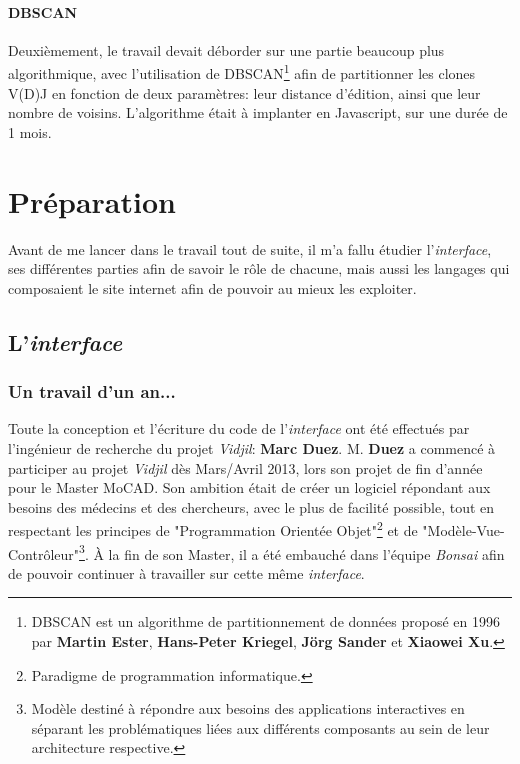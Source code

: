 \documentclass[pdftex,12pt,a4paper]{report}
\begin{document}
\begin{spacing}{1.2}
\subsubsection{DBSCAN}
Deuxièmement, le travail devait déborder sur une partie beaucoup plus algorithmique, avec l'utilisation de DBSCAN\footnote{DBSCAN est un algorithme de partitionnement de données proposé en 1996 par \textbf{Martin Ester}, \textbf{Hans-Peter Kriegel}, \textbf{Jörg Sander} et \textbf{Xiaowei Xu}.} afin de partitionner les clones V(D)J en fonction de deux paramètres: leur distance d'édition, ainsi que leur nombre de voisins.
\newline
L'algorithme était à implanter en Javascript, sur une durée de 1 mois.

\chapter{Préparation}

Avant de me lancer dans le travail tout de suite, il m'a fallu étudier l'\textit{interface}, ses différentes parties afin de savoir le rôle de chacune, mais aussi les langages qui composaient le site internet afin de pouvoir au mieux les exploiter.

\section{L'\textit{interface}}

\subsection{Un travail d'un an...}
Toute la conception et l'écriture du code de l'\textit{interface} ont été effectués par l'ingénieur de recherche du projet \textit{Vidjil}: \textbf{Marc Duez}. 
\newline
M. \textbf{Duez} a commencé à participer au projet \textit{Vidjil} dès Mars/Avril 2013, lors son projet de fin d'année pour le Master MoCAD.
Son ambition était de créer un logiciel répondant aux besoins des médecins et des chercheurs, avec le plus de facilité possible, tout en respectant les principes de "Programmation Orientée Objet"\footnote{Paradigme de programmation informatique.} et de "Modèle-Vue-Contrôleur"\footnote{Modèle destiné à répondre aux besoins des applications interactives en séparant les problématiques liées aux différents composants au sein de leur architecture respective.}.
\newline
À la fin de son Master, il a été embauché dans l'équipe \textit{Bonsai} afin de pouvoir continuer à travailler sur cette même \textit{interface}.


\end{spacing}
\end{document}
